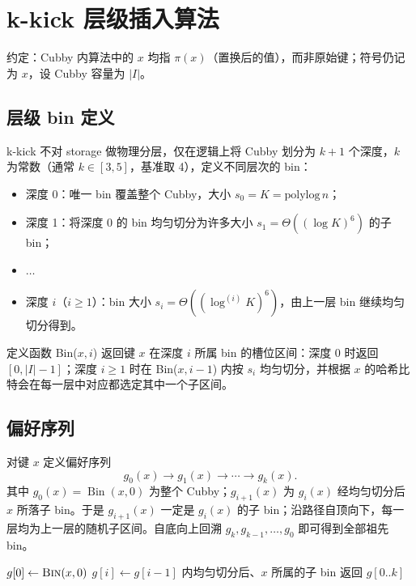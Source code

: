 \section{k-kick 层级插入算法}

约定：Cubby 内算法中的 \(x\) 均指 \(\pi(x)\)（置换后的值），而非原始键；符号仍记为 \(x\)，设 Cubby 容量为 \(|I|\)。

\subsection{层级 bin 定义}

k-kick 不对 storage 做物理分层，仅在逻辑上将 Cubby 划分为 \(k+1\) 个深度，\(k\) 为常数（通常 \(k\in[3,5]\)，基准取 4），定义不同层次的 bin：
\begin{itemize}
  \item 深度 0：唯一 bin 覆盖整个 Cubby，大小 \(s_0=K=\mathrm{polylog}\,n\)；
  \item 深度 1：将深度 0 的 bin 均匀切分为许多大小 \(s_1=\Theta((\log K)^6)\) 的子 bin；
  \item \( \dots \)
  \item 深度 \(i\)（\(i\ge 1\)）：bin 大小 \(s_i=\Theta((\log^{(i)}K)^6)\)，由上一层 bin 继续均匀切分得到。
\end{itemize}

定义函数 Bin(\(x,i\)) 返回键 \(x\) 在深度 \(i\) 所属 bin 的槽位区间：深度 0 时返回 \([0,|I|-1]\)；深度 \(i\ge 1\) 时在 Bin(\(x,i-1\)) 内按 \(s_i\) 均匀切分，并根据 \(x\) 的哈希比特会在每一层中对应都选定其中一个子区间\cite{bender2022otsh,carter1979}。

\subsection{偏好序列}

对键 \(x\) 定义偏好序列
\[
  g_0(x)\rightarrow g_1(x)\rightarrow\cdots\rightarrow g_k(x).
\]
其中 \(g_0(x)=\operatorname{Bin}(x,0)\) 为整个 Cubby；\(g_{i+1}(x)\) 为 \(g_i(x)\) 经均匀切分后 \(x\) 所落子 bin。于是 \(g_{i+1}(x)\) 一定是 \(g_i(x)\) 的子 bin；沿路径自顶向下，每一层均为上一层的随机子区间。自底向上回溯 \(g_k,g_{k-1},\ldots,g_0\) 即可得到全部祖先 bin。

\begin{algorithm}[htbp]
  \caption{PreferenceSequence：偏好序列}
  \label{alg:pref-seq}
  \begin{algorithmic}[1]
      \State $g[0]\gets\Call{Bin}{x,0}$
        \State $g[i]\gets g[i-1]$ 内均匀切分后、$x$ 所属的子 bin
      \EndFor
      \State 返回 $g[0..k]$
    \EndFunction
  \end{algorithmic}
\end{algorithm}

